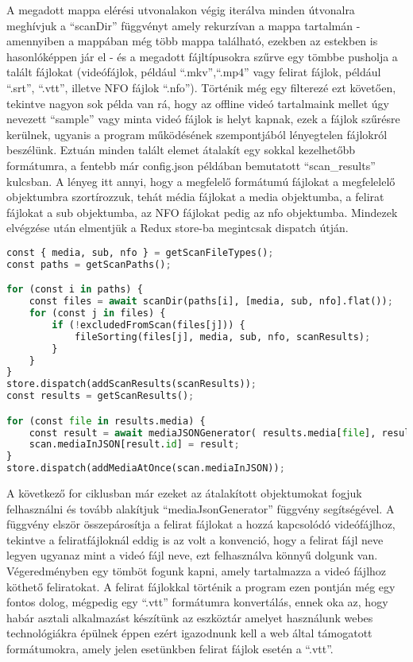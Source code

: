 A megadott mappa elérési utvonalakon végig iterálva minden útvonalra meghívjuk a ``scanDir'' függvényt amely rekurzívan a mappa tartalmán - amennyiben a mappában még több mappa található, ezekben az estekben is hasonlóképpen jár el - és a megadott fájltípusokra szűrve egy tömbbe pusholja a talált fájlokat (videófájlok, például ``.mkv'',``.mp4'' vagy felirat fájlok, például ``.srt'', ``.vtt'', illetve NFO fájlok ``.nfo''). Történik még egy filterezé ezt követően, tekintve nagyon sok példa van rá, hogy az offline videó tartalmaink mellet úgy nevezett ``sample'' vagy minta videó fájlok is helyt kapnak, ezek a fájlok szűrésre kerülnek, ugyanis a program működésének szempontjából lényegtelen fájlokról beszélünk. Eztuán minden talált elemet átalakít egy sokkal kezelhetőbb formátumra, a fentebb már config.json példában bemutatott ``scan\_results'' kulcsban. A lényeg itt annyi, hogy a megfelelő formátumú fájlokat a megfelelelő objektumbra szortírozzuk, tehát média fájlokat a media objektumba, a felirat fájlokat a sub objektumba, az NFO fájlokat pedig az nfo objektumba. Mindezek elvégzése után elmentjük a Redux store-ba megintcsak dispatch útján.

\begin{lstlisting}[language={python}]
const { media, sub, nfo } = getScanFileTypes();
const paths = getScanPaths();

for (const i in paths) {
    const files = await scanDir(paths[i], [media, sub, nfo].flat());
    for (const j in files) {
        if (!excludedFromScan(files[j])) {
            fileSorting(files[j], media, sub, nfo, scanResults);
        }
    }
}
store.dispatch(addScanResults(scanResults));
const results = getScanResults();

for (const file in results.media) {
    const result = await mediaJSONGenerator( results.media[file], results );
    scan.mediaInJSON[result.id] = result;
}
store.dispatch(addMediaAtOnce(scan.mediaInJSON));
\end{lstlisting}

A következő for ciklusban már ezeket az átalakított objektumokat fogjuk felhasználni és tovább alakítjuk ``mediaJsonGenerator'' függvény segítségével. A függvény elször összepárosítja a felirat fájlokat a hozzá kapcsolódó videófájlhoz, tekintve a feliratfájloknál eddig is az volt a konvenció, hogy a felirat fájl neve legyen ugyanaz mint a videó fájl neve, ezt felhasználva könnyű dolgunk van. Végeredményben egy tömböt fogunk kapni, amely tartalmazza a videó fájlhoz köthető feliratokat. A felirat fájlokkal történik a program ezen pontján még egy fontos dolog, mégpedig egy ``.vtt'' formátumra konvertálás, ennek oka az, hogy habár asztali alkalmazást készítünk az eszköztár amelyet használunk webes technológiákra épülnek éppen ezért igazodnunk kell a web által támogatott formátumokra, amely jelen esetünkben felirat fájlok esetén a ``.vtt''.

